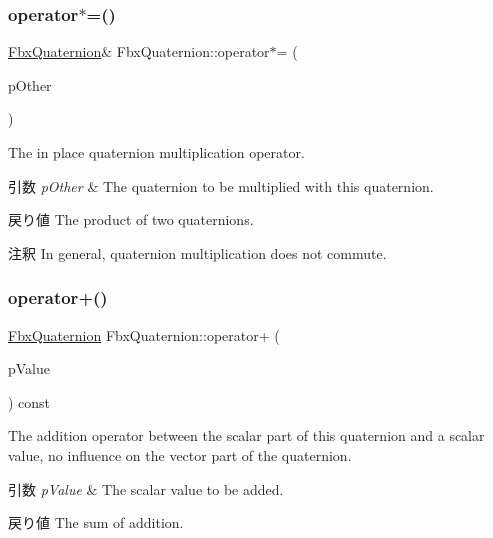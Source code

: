 \subsubsection{\texorpdfstring{operator$\ast$=()}{operator*=()}\hspace{0.1cm}{\footnotesize\ttfamily [2/2]}}
{\footnotesize\ttfamily \hyperlink{class_fbx_quaternion}{Fbx\+Quaternion}\& Fbx\+Quaternion\+::operator$\ast$= (\begin{DoxyParamCaption}\item[{const \hyperlink{class_fbx_quaternion}{Fbx\+Quaternion} \&}]{p\+Other }\end{DoxyParamCaption})}

The in place quaternion multiplication operator. 
\begin{DoxyParams}{引数}
{\em p\+Other} & The quaternion to be multiplied with this quaternion. \\
\hline
\end{DoxyParams}
\begin{DoxyReturn}{戻り値}
The product of two quaternions. 
\end{DoxyReturn}
\begin{DoxyRemark}{注釈}
In general, quaternion multiplication does not commute. 
\end{DoxyRemark}
\mbox{\label{class_fbx_quaternion_a61aa713f7fce6b7eb20e8b809904cf30}} 
\subsubsection{\texorpdfstring{operator+()}{operator+()}\hspace{0.1cm}{\footnotesize\ttfamily [1/2]}}
{\footnotesize\ttfamily \hyperlink{class_fbx_quaternion}{Fbx\+Quaternion} Fbx\+Quaternion\+::operator+ (\begin{DoxyParamCaption}\item[{double}]{p\+Value }\end{DoxyParamCaption}) const}

The addition operator between the scalar part of this quaternion and a scalar value, no influence on the vector part of the quaternion. 
\begin{DoxyParams}{引数}
{\em p\+Value} & The scalar value to be added. \\
\hline
\end{DoxyParams}
\begin{DoxyReturn}{戻り値}
The sum of addition. 
\end{DoxyReturn}
\mbox{\label{class_fbx_quaternion_ae4b5759bbd1b61bc49a4aeb2a1f92fae}} 
